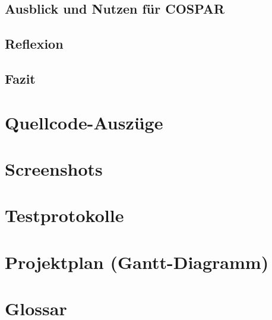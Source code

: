 \documentclass[11pt,a4paper]{article}
\begin{document}
\subsection{Ausblick und Nutzen für COSPAR}

\subsection{Reflexion}

\subsection{Fazit}

\appendix

\section{Quellcode-Auszüge}

\section{Screenshots}

\section{Testprotokolle}

\section{Projektplan (Gantt-Diagramm)}

\section{Glossar}

\begin{thebibliography}{99}
\end{thebibliography}
\end{document}
